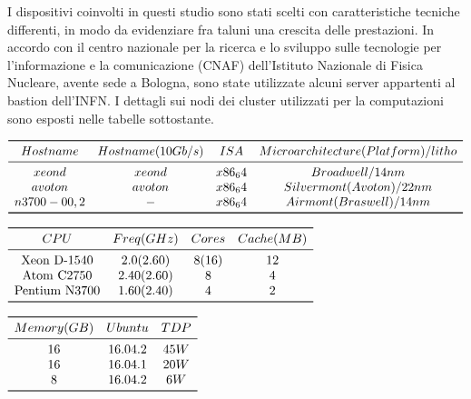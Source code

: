 I dispositivi coinvolti in questi studio sono stati scelti con caratteristiche tecniche differenti, in modo da evidenziare fra taluni una crescita delle prestazioni. In accordo con il centro nazionale per la ricerca e lo sviluppo sulle tecnologie per l'informazione e la comunicazione (CNAF) dell'Istituto Nazionale di Fisica Nucleare, avente sede a Bologna, sono state utilizzate alcuni server appartenti al bastion dell'INFN. I dettagli sui nodi dei cluster utilizzati per la computazioni sono esposti nelle tabelle sottostante.
\begin{table}
\centering 
$\begin{array}{*{4}{c}}
	\toprule
		Hostname & Hostname(10Gb/s) & ISA & Microarchitecture(Platform)/litho \\
	\midrule
		xeond & xeond & x86_64 & Broadwell/14nm \\
		avoton & avoton & x86_64 & Silvermont(Avoton)/22nm \\
		n3700-0{0,2} & - & x86_64 & Airmont(Braswell)/14nm \\	
	\bottomrule
\end{array}$
\caption{}
\end{table} 

\begin{table}
\centering 
$\begin{array}{*{4}{c}}
	\toprule
		CPU & Freq(GHz) & Cores & Cache(MB)\\
	\midrule
		\text{Xeon D-1540} & 2.0(2.60) & 8(16) & 12 \\
		\text{Atom C2750} & 2.40(2.60) & 8 & 4 \\
		\text{Pentium N3700} & 1.60(2.40) & 4 & 2 \\		
	\bottomrule
\end{array}$
\caption{}
\end{table} 

\begin{table}
\centering 
$\begin{array}{*{4}{c}}
	\toprule
		Memory(GB) & Ubuntu & TDP \\
	\midrule
		16 & 16.04.2 & 45W \\
		16 & 16.04.1 & 20W \\
		8 & 16.04.2 & 6W \\
	\bottomrule
\end{array}$
\caption{}
\end{table} 


         